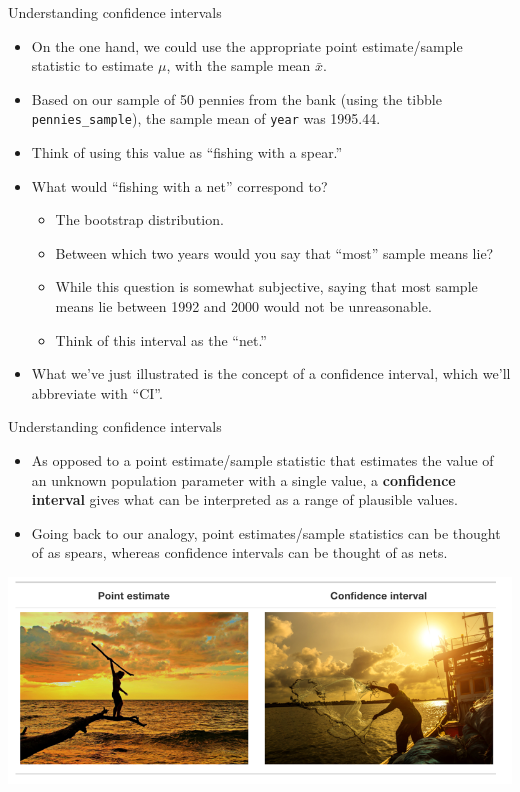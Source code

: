 \documentclass[
  ignorenonframetext,
]{beamer}
\providecommand{\tightlist}{%
  \setlength{\itemsep}{0pt}\setlength{\parskip}{0pt}}
\begin{document}
\begin{frame}[fragile]{Understanding confidence intervals}
\protect\hypertarget{understanding-confidence-intervals-2}{}
\begin{itemize}
\item
  On the one hand, we could use the appropriate point estimate/sample
  statistic to estimate \(\mu\), with the sample mean \(\bar{x}\).
\item
  Based on our sample of 50 pennies from the bank (using the tibble
  \texttt{pennies\_sample}), the sample mean of \texttt{year} was
  1995.44.
\item
  Think of using this value as ``fishing with a spear.''
\item
  What would ``fishing with a net'' correspond to?

  \begin{itemize}
  \tightlist
  \item
    The bootstrap distribution.
  \item
    Between which two years would you say that ``most'' sample means
    lie?
  \item
    While this question is somewhat subjective, saying that most sample
    means lie between 1992 and 2000 would not be unreasonable.
  \item
    Think of this interval as the ``net.''
  \end{itemize}
\item
  What we've just illustrated is the concept of a confidence interval,
  which we'll abbreviate with ``CI''.
\end{itemize}
\end{frame}

\begin{frame}{Understanding confidence intervals}
\protect\hypertarget{understanding-confidence-intervals-3}{}
\begin{itemize}
\item
  As opposed to a point estimate/sample statistic that estimates the
  value of an unknown population parameter with a single value, a
  \textbf{confidence interval} gives what can be interpreted as a range
  of plausible values.
\item
  Going back to our analogy, point estimates/sample statistics can be
  thought of as spears, whereas confidence intervals can be thought of
  as nets.
\end{itemize}

\begin{center}\includegraphics[width=0.7\linewidth,height=0.4\textheight]{week10_7} \end{center}
\end{frame}
\end{document}
